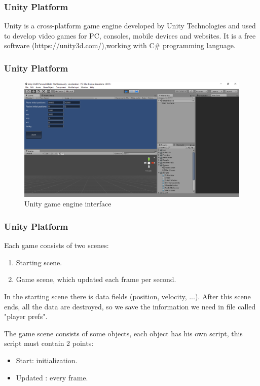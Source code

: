 \documentclass{beamer}
\begin{document}
\begin{frame}
\frametitle{Unity Platform}
Unity is a cross-platform game engine developed by Unity Technologies and used to develop video games for PC, consoles, mobile devices and websites. It is a free software (https://unity3d.com/),working with C\# programming language. 
\end{frame}
\begin{frame}
\frametitle{Unity Platform}
\begin{figure}[H]
	\centering
	\includegraphics[scale = 0.2]{fig/unityInterface.PNG}
	\caption{Unity game engine interface }
	\label{UnityInterface}
\end{figure}
\end{frame}
\begin{frame}
\frametitle{Unity Platform}

Each game consists of two scenes:
\begin{enumerate}
	\item Starting scene.
	\item Game scene, which updated each frame per second.
\end{enumerate}

In the starting scene there is data fields (position, velocity, ...). After this scene ends, all the data are destroyed, so we save the information we need in file called "player prefs".

The game scene consists of some objects, each object has his own script, this script must contain 2 points:
\begin{itemize}
	\item Start: initialization.
	\item Updated : every frame.
\end{itemize} 
\end{frame}
\end{document}
